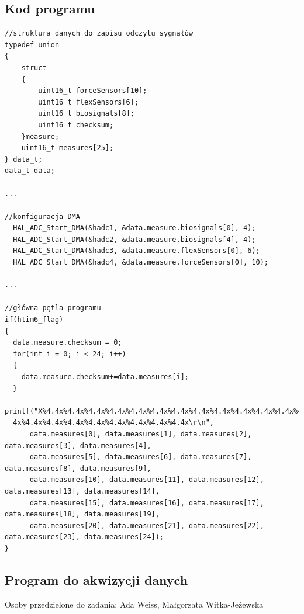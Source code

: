 \documentclass{article}
\begin{document}
\subsection{Kod programu}
\begin{verbatim}
//struktura danych do zapisu odczytu sygnałów
typedef union
{
	struct
	{
		uint16_t forceSensors[10];
		uint16_t flexSensors[6];
		uint16_t biosignals[8];
		uint16_t checksum;
	}measure;
	uint16_t measures[25];
} data_t;
data_t data;

...

//konfiguracja DMA
  HAL_ADC_Start_DMA(&hadc1, &data.measure.biosignals[0], 4);
  HAL_ADC_Start_DMA(&hadc2, &data.measure.biosignals[4], 4);
  HAL_ADC_Start_DMA(&hadc3, &data.measure.flexSensors[0], 6);
  HAL_ADC_Start_DMA(&hadc4, &data.measure.forceSensors[0], 10);

...

//główna pętla programu
if(htim6_flag)
{
  data.measure.checksum = 0;
  for(int i = 0; i < 24; i++)
  {
    data.measure.checksum+=data.measures[i];
  }
  printf("X%4.4x%4.4x%4.4x%4.4x%4.4x%4.4x%4.4x%4.4x%4.4x%4.4x%4.4x%4.4x%4.4x%4.4x%4.4x%4.4x%4.
  4x%4.4x%4.4x%4.4x%4.4x%4.4x%4.4x%4.4x%4.4x\r\n",
	  data.measures[0], data.measures[1], data.measures[2], data.measures[3], data.measures[4],
	  data.measures[5], data.measures[6], data.measures[7], data.measures[8], data.measures[9],
	  data.measures[10], data.measures[11], data.measures[12], data.measures[13], data.measures[14],
	  data.measures[15], data.measures[16], data.measures[17], data.measures[18], data.measures[19],
	  data.measures[20], data.measures[21], data.measures[22], data.measures[23], data.measures[24]);
}
\end{verbatim}

\subsection{Program do akwizycji danych}

Osoby przedzielone do zadania: Ada Weiss, Małgorzata Witka-Jeżewska
\end{document}
